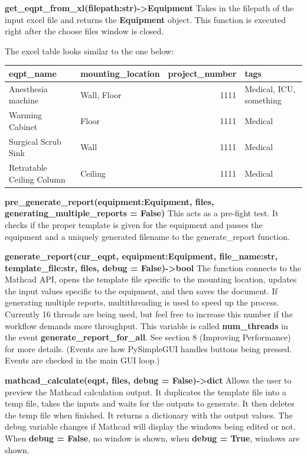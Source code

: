 \documentclass[11pt]{article}
\begin{document}
\textbf{get\_eqpt\_from\_xl(filepath:str)->Equipment}
    Takes in the filepath of the input excel file and returns the \textbf{Equipment} object. This function is executed right after the choose files window is closed.

The excel table looks similar to the one below:
\begin{center}
\begin{tabular}{llrl}
\hline
eqpt\_name & mounting\_location & project\_number & tags\\
\hline
Anesthesia machine & Wall, Floor & 1111 & Medical, ICU, something\\
Warming Cabinet & Floor & 1111 & Medical\\
Surgical Scrub Sink & Wall & 1111 & Medical\\
Retratable Ceiling Column & Ceiling & 1111 & Medical\\
\hline
\end{tabular}
\end{center}

\textbf{pre\_generate\_report(equipment:Equipment, files, generating\_multiple\_reports = False)}
    This acts as a pre-fight test. It checks if the proper template is given for the equipment and passes the equipment and a uniquely generated filename to the generate\_report function.

\textbf{generate\_report(cur\_eqpt, equipment:Equipment, file\_name:str, template\_file:str, files, debug = False)->bool}
    The function connects to the Mathcad API, opens the template file specific to the mounting location, updates the input values specific to the equipment, and then saves the document. If generating multiple reports, multithreading is used to speed up the process. Currently 16 threads are being used, but feel free to increase this number if the workflow demands more throughput. This variable is called \textbf{num\_threads} in the event \textbf{generate\_report\_for\_all}. See section 8 (Improving Performance) for more details. (Events are how PySimpleGUI handles buttons being pressed. Events are checked in the main GUI loop.)

\textbf{mathcad\_calculate(eqpt, files, debug = False)->dict}
    Allows the user to preview the Mathcad calculation output. It duplicates the template file into a temp file, takes the inputs and waits for the outputs to generate. It then deletes the temp file when finished. It returns a dictionary with the output values. The debug variable changes if Mathcad will display the windows being edited or not. When \textbf{debug = False}, no window is shown, when \textbf{debug = True}, windows are shown.
\end{document}
